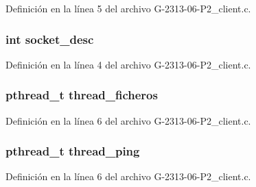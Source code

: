 Definición en la línea 5 del archivo G-\/2313-\/06-\/\+P2\+\_\+client.\+c.

\subsubsection[{\texorpdfstring{socket\+\_\+desc}{socket_desc}}]{\setlength{\rightskip}{0pt plus 5cm}int socket\+\_\+desc}\hypertarget{G-2313-06-P2__client_8c_adeadf7cb6916a10c7142ce7d265ab32a}{}\label{G-2313-06-P2__client_8c_adeadf7cb6916a10c7142ce7d265ab32a}


Definición en la línea 4 del archivo G-\/2313-\/06-\/\+P2\+\_\+client.\+c.

\subsubsection[{\texorpdfstring{thread\+\_\+ficheros}{thread_ficheros}}]{\setlength{\rightskip}{0pt plus 5cm}pthread\+\_\+t thread\+\_\+ficheros}\hypertarget{G-2313-06-P2__client_8c_a497238a5c30172237878376d95472ce4}{}\label{G-2313-06-P2__client_8c_a497238a5c30172237878376d95472ce4}


Definición en la línea 6 del archivo G-\/2313-\/06-\/\+P2\+\_\+client.\+c.

\subsubsection[{\texorpdfstring{thread\+\_\+ping}{thread_ping}}]{\setlength{\rightskip}{0pt plus 5cm}pthread\+\_\+t thread\+\_\+ping}\hypertarget{G-2313-06-P2__client_8c_a081c16d23aa5029dd2454dfb0c355eb0}{}\label{G-2313-06-P2__client_8c_a081c16d23aa5029dd2454dfb0c355eb0}


Definición en la línea 6 del archivo G-\/2313-\/06-\/\+P2\+\_\+client.\+c.

